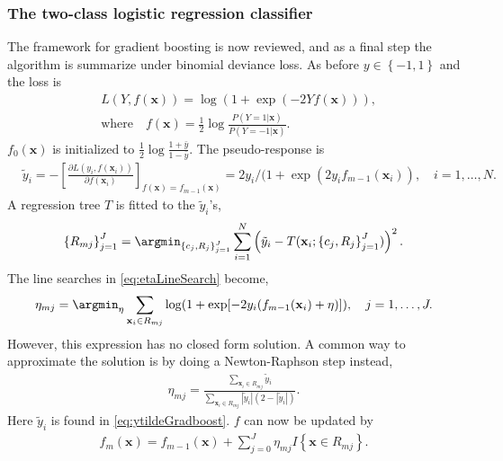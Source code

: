 \subsubsection{The two-class logistic regression classifier}
\label{sub:The two-class logistic regression classifier}
The framework for gradient boosting is now reviewed, and as a final step the algorithm is summarize under binomial deviance loss. As before $y \in \left\{ -1, 1 \right\}$ and the loss is 
\begin{align}
  &L(Y, f(\mathbf{x})) = \log (1 + \exp (-2 Y f(\mathbf{x}))),\\
  &\text{where} \quad f(\mathbf{x}) = \frac{1}{2} \log \frac{ P(Y = 1 | \mathbf{x})}{ P(Y = -1 | \mathbf{x})}  .
\end{align}
$f_0(\mathbf{x})$ is initialized to $\frac{1}{2} \log \frac{1+\bar{y}}{1-\bar{y}}$.  The pseudo-response is
\begin{align}
  \label{eq:ytildeGradboost} 
  &\tilde{y}_i = 
  -\left[ \frac{\partial L(y_i, f(\mathbf{x}_i)) }{\partial f(\mathbf{x}_i)}  \right]_{f(\mathbf{x}) = f_{m-1}(\mathbf{x})}
  = 2 y_i / (1 + \exp \left( 2 y_i f_{m-1}(\mathbf{x}_i) \right), \quad i = 1, \ldots, N.
\end{align}
A regression tree $T$ is fitted to the $\tilde y_i$'s,
\begin{align}
  \left\{ R_{m j} \right\}_{j = 1}^J  = 
  \argmin_{\left\{ c_j, R_{j} \right\}_{j = 1}^J} \sum^{N}_{i=1} \left( \tilde y_i - T(\mathbf{x}_i; \left\{ c_j, R_j \right\}_{j = 1}^J) \right)^2.
\end{align}
The line searches in \eqref{eq:etaLineSearch} become,
\begin{align}
  \eta_{m j} = \argmin_\eta  \sum_{\mathbf{x}_i \in R_{m j}} \log (1 + \exp [-2 y_i (f_{m-1}(\mathbf{x}_i) + \eta) ]), \quad j = 1, \ldots, J.
\end{align}
However, this expression has no closed form solution. A common way to approximate the solution is by doing a Newton-Raphson step instead,
\begin{align}
  \eta_{m j} =  \frac{\sum_{\mathbf{x}_i \in R_{m j}} \tilde y_i}{\sum_{\mathbf{x}_i \in R_{m j}} |\tilde y_i|(2-|\tilde y_i|)}.
\end{align}
Here  $\tilde y_i$ is found in \eqref{eq:ytildeGradboost}. $f$ can now be updated by
\begin{align}
  \label{eq:gradBoostUpdateF} 
  f_m(\mathbf{x}) = f_{m-1}(\mathbf{x}) +  \sum^{J}_{j=0} \eta_{m j} I\left\{ \mathbf{x} \in R_{m j} \right\}.
\end{align}
